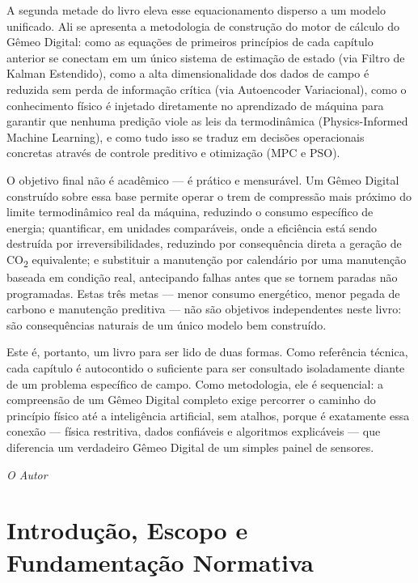 \documentclass[12pt,a4paper]{article}
\numberwithin{equation}{section}
\numberwithin{table}{section}
\numberwithin{figure}{section}
\begin{document}
A segunda metade do livro eleva esse equacionamento disperso a um modelo unificado. Ali se apresenta a metodologia de construção do motor de cálculo do Gêmeo Digital: como as equações de primeiros princípios de cada capítulo anterior se conectam em um único sistema de estimação de estado (via Filtro de Kalman Estendido), como a alta dimensionalidade dos dados de campo é reduzida sem perda de informação crítica (via Autoencoder Variacional), como o conhecimento físico é injetado diretamente no aprendizado de máquina para garantir que nenhuma predição viole as leis da termodinâmica (Physics-Informed Machine Learning), e como tudo isso se traduz em decisões operacionais concretas através de controle preditivo e otimização (MPC e PSO).

O objetivo final não é acadêmico — é prático e mensurável. Um Gêmeo Digital construído sobre essa base permite operar o trem de compressão mais próximo do limite termodinâmico real da máquina, reduzindo o consumo específico de energia; quantificar, em unidades comparáveis, onde a eficiência está sendo destruída por irreversibilidades, reduzindo por consequência direta a geração de CO\textsubscript{2} equivalente; e substituir a manutenção por calendário por uma manutenção baseada em condição real, antecipando falhas antes que se tornem paradas não programadas. Estas três metas — menor consumo energético, menor pegada de carbono e manutenção preditiva — não são objetivos independentes neste livro: são consequências naturais de um único modelo bem construído.

Este é, portanto, um livro para ser lido de duas formas. Como referência técnica, cada capítulo é autocontido o suficiente para ser consultado isoladamente diante de um problema específico de campo. Como metodologia, ele é sequencial: a compreensão de um Gêmeo Digital completo exige percorrer o caminho do princípio físico até a inteligência artificial, sem atalhos, porque é exatamente essa conexão — física restritiva, dados confiáveis e algoritmos explicáveis — que diferencia um verdadeiro Gêmeo Digital de um simples painel de sensores.

\vspace{1em}
\hfill \textit{O Autor}




\newpage



	
	
	\clearpage
	\section{\textbf{Introdução, Escopo e Fundamentação Normativa}}
	
\end{document}

